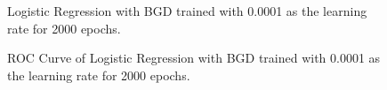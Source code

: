 \documentclass{article} %
\begin{document}
\begin{figure}[!htbp]
\begin{center}
\end{center}
\caption{Logistic Regression with BGD trained with 0.0001 as the learning rate for 2000 epochs.}
\label{Fig15}
\end{figure}

\begin{figure}[!htbp]
\begin{center}
\end{center}
\caption{ROC Curve of Logistic Regression with BGD trained with 0.0001 as the learning rate for 2000 epochs.}
\label{Fig16}
\end{figure}

\clearpage

\nocite{python_list_comprehensions, python_zip, python_sum, plotly}
\printbibliography
\end{document}
